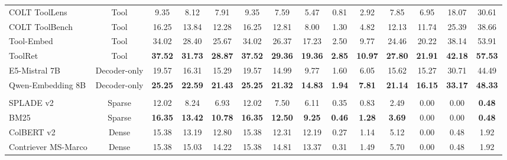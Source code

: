 \documentclass{article} %
\begin{document}
\begin{table}[!t]
{\begin{tabular}{lccccccccccccc}
\hline
COLT ToolLens & Tool & 9.35 & 8.12 & 7.91 & 9.35 & 7.59 & 5.47 & 0.81 & 2.92 & 7.85 & 6.95 & 18.07 & 30.61 \\
COLT ToolBench & Tool & 16.25 & 13.84 & 12.28 & 16.25 & 12.81 & 8.00 & 1.30 & 4.82 & 12.13 & 11.74 & 25.39 & 38.66 \\
Tool-Embed & Tool & 34.02 & 28.40 & 25.67 & 34.02 & 26.37 & 17.23 & 2.50 & 9.77 & 24.46 & 20.22 & 38.14 & 53.91 \\
ToolRet & Tool & \cellcolor{aliceblue}\textbf{37.52} & \cellcolor{aliceblue}\textbf{31.73} & \cellcolor{aliceblue}\textbf{28.87} & \cellcolor{aliceblue}\textbf{37.52} & \cellcolor{aliceblue}\textbf{29.36} & \cellcolor{aliceblue}\textbf{19.36} & \cellcolor{aliceblue}\textbf{2.85} & \cellcolor{aliceblue}\textbf{10.97} & \cellcolor{aliceblue}\textbf{27.80} & \cellcolor{aliceblue}\textbf{21.91} & \cellcolor{aliceblue}\textbf{42.18} & \cellcolor{aliceblue}\textbf{57.53} \\
\hline
E5-Mistral 7B & Decoder-only & 19.57 & 16.31 & 15.29 & 19.57 & 14.99 & 9.77 & 1.60 & 6.05 & 15.62 & 15.27 & 30.71 & 44.49 \\
Qwen-Embedding 8B & Decoder-only & \cellcolor{aliceblue}\textbf{25.25} & \cellcolor{aliceblue}\textbf{22.59} & \cellcolor{aliceblue}\textbf{21.43} & \cellcolor{aliceblue}\textbf{25.25} & \cellcolor{aliceblue}\textbf{21.32} & \cellcolor{aliceblue}\textbf{14.83} & \cellcolor{aliceblue}\textbf{1.94} & \cellcolor{aliceblue}\textbf{7.81} & \cellcolor{aliceblue}\textbf{21.14} & \cellcolor{aliceblue}\textbf{16.15} & \cellcolor{aliceblue}\textbf{33.17} & \cellcolor{aliceblue}\textbf{48.33} \\
\midrule
\rowcolor{oldlace}\multicolumn{14}{c}{\textit{Task Description}} \\
\hline
SPLADE v2 & Sparse & 12.02 & 8.24 & 6.93 & 12.02 & 7.50 & 6.11 & 0.35 & 0.83 & 2.49 & 0.00 & 0.00 & \cellcolor{aliceblue}\textbf{0.48} \\
BM25 & Sparse & \cellcolor{aliceblue}\textbf{16.35} & \cellcolor{aliceblue}\textbf{13.42} & \cellcolor{aliceblue}\textbf{10.78} & \cellcolor{aliceblue}\textbf{16.35} & \cellcolor{aliceblue}\textbf{12.50} & \cellcolor{aliceblue}\textbf{9.25} & \cellcolor{aliceblue}\textbf{0.46} & \cellcolor{aliceblue}\textbf{1.28} & \cellcolor{aliceblue}\textbf{3.69} & 0.00 & 0.00 & \cellcolor{aliceblue}\textbf{0.48} \\
\hline
ColBERT v2 & Dense & 15.38 & 13.19 & 12.80 & 15.38 & 12.31 & 12.19 & 0.27 & 1.14 & 5.12 & 0.00 & 0.48 & 1.92 \\
Contriever MS-Marco & Dense & 15.38 & 15.03 & 14.22 & 15.38 & 14.81 & 13.37 & 0.31 & 1.49 & 5.70 & 0.00 & 0.48 & 1.92 \\

\end{tabular}}
\end{table}
\end{document}
